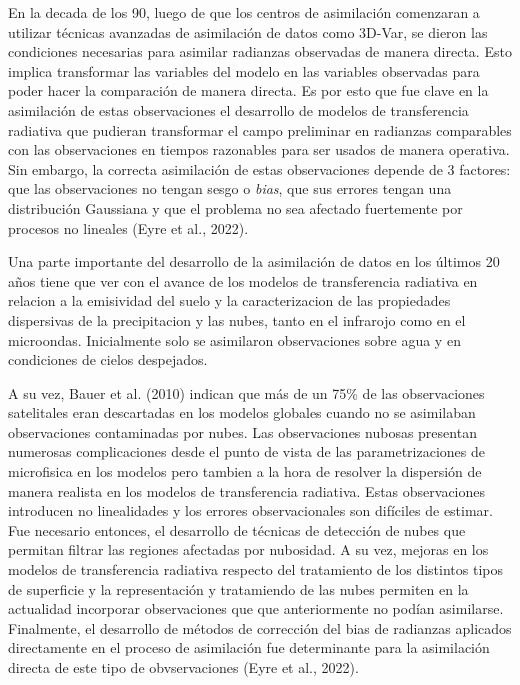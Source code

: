 \documentclass[12pt,oneside,a4paper]{reedthesis}
\begin{document}
En la decada de los 90, luego de que los centros de asimilación comenzaran a utilizar técnicas avanzadas de asimilación de datos como 3D-Var, se dieron las condiciones necesarias para asimilar radianzas observadas de manera directa. Esto implica transformar las variables del modelo en las variables observadas para poder hacer la comparación de manera directa. Es por esto que fue clave en la asimilación de estas observaciones el desarrollo de modelos de transferencia radiativa que pudieran transformar el campo preliminar en radianzas comparables con las observaciones en tiempos razonables para ser usados de manera operativa. Sin embargo, la correcta asimilación de estas observaciones depende de 3 factores: que las observaciones no tengan sesgo o \emph{bias}, que sus errores tengan una distribución Gaussiana y que el problema no sea afectado fuertemente por procesos no lineales (Eyre et al., 2022).

Una parte importante del desarrollo de la asimilación de datos en los últimos 20 años tiene que ver con el avance de los modelos de transferencia radiativa en relacion a la emisividad del suelo y la caracterizacion de las propiedades dispersivas de la precipitacion y las nubes, tanto en el infrarojo como en el microondas. Inicialmente solo se asimilaron observaciones sobre agua y en condiciones de cielos despejados.

A su vez, Bauer et al. (2010) indican que más de un 75\% de las observaciones satelitales eran descartadas en los modelos globales cuando no se asimilaban observaciones contaminadas por nubes. Las observaciones nubosas presentan numerosas complicaciones desde el punto de vista de las parametrizaciones de microfisica en los modelos pero tambien a la hora de resolver la dispersión de manera realista en los modelos de transferencia radiativa. Estas observaciones introducen no linealidades y los errores observacionales son difíciles de estimar. Fue necesario entonces, el desarrollo de técnicas de detección de nubes que permitan filtrar las regiones afectadas por nubosidad. A su vez, mejoras en los modelos de transferencia radiativa respecto del tratamiento de los distintos tipos de superficie y la representación y tratamiendo de las nubes permiten en la actualidad incorporar observaciones que que anteriormente no podían asimilarse. Finalmente, el desarrollo de métodos de corrección del bias de radianzas aplicados directamente en el proceso de asimilación fue determinante para la asimilación directa de este tipo de obvservaciones (Eyre et al., 2022).
\end{document}
